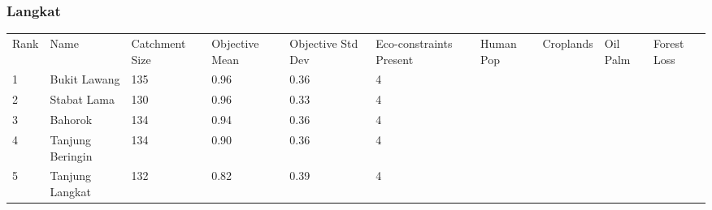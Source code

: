 \subsubsection{Langkat}
\begin{table}[ht]
\centering
\begingroup\fontsize{8pt}{9pt}\selectfont
\begin{tabular}{C{0.03\textwidth}C{0.12\textwidth}C{0.09\textwidth}C{0.08\textwidth}C{0.08\textwidth}C{0.08\textwidth}C{0.07\textwidth}C{0.07\textwidth}C{0.07\textwidth}C{0.07\textwidth}}
 Rank & Name & Catchment Size & Objective Mean & Objective Std Dev & Eco-constraints  Present & Human Pop & Croplands & Oil Palm & Forest Loss \\ 
 {1} & Bukit Lawang & 135 & \textcolor[HTML]{FFFFFF}{0.96} & \textcolor[HTML]{000000}{0.36} & \textcolor[HTML]{000000}{4} &  &  &  &  \\ 
  {2} & Stabat Lama & 130 & \textcolor[HTML]{FFFFFF}{0.96} & \textcolor[HTML]{000000}{0.33} & \textcolor[HTML]{000000}{4} &  &  &  &  \\ 
  {3} & Bahorok & 134 & \textcolor[HTML]{FFFFFF}{0.94} & \textcolor[HTML]{000000}{0.36} & \textcolor[HTML]{000000}{4} &  &  &  &  \\ 
  {4} & Tanjung Beringin & 134 & \textcolor[HTML]{FFFFFF}{0.90} & \textcolor[HTML]{000000}{0.36} & \textcolor[HTML]{000000}{4} &  &  &  &  \\ 
  {5} & Tanjung Langkat & 132 & \textcolor[HTML]{FFFFFF}{0.82} & \textcolor[HTML]{000000}{0.39} & \textcolor[HTML]{000000}{4} &  &  &  &  \\ 

\end{tabular}
\end{table}
